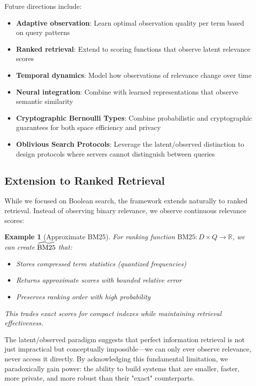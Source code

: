 \documentclass[11pt,final,hidelinks]{article}
\newtheorem{example}[theorem]{Example}
\begin{document}
Future directions include:
\begin{itemize}
    \item \textbf{Adaptive observation}: Learn optimal observation quality per term based on query patterns
    \item \textbf{Ranked retrieval}: Extend to scoring functions that observe latent relevance scores
    \item \textbf{Temporal dynamics}: Model how observations of relevance change over time
    \item \textbf{Neural integration}: Combine with learned representations that observe semantic similarity
    \item \textbf{Cryptographic Bernoulli Types}: Combine probabilistic and cryptographic guarantees for both space efficiency and privacy
    \item \textbf{Oblivious Search Protocols}: Leverage the latent/observed distinction to design protocols where servers cannot distinguish between queries
\end{itemize}

\subsection{Extension to Ranked Retrieval}

While we focused on Boolean search, the framework extends naturally to ranked retrieval. Instead of observing binary relevance, we observe continuous relevance scores:

\begin{example}[Approximate BM25]
For ranking function $\text{BM25}: D \times Q \to \mathbb{R}$, we can create $\widetilde{\text{BM25}}$ that:
\begin{itemize}
    \item Stores compressed term statistics (quantized frequencies)
    \item Returns approximate scores with bounded relative error
    \item Preserves ranking order with high probability
\end{itemize}
This trades exact scores for compact indexes while maintaining retrieval effectiveness.
\end{example}

The latent/observed paradigm suggests that perfect information retrieval is not just impractical but conceptually impossible—we can only ever observe relevance, never access it directly. By acknowledging this fundamental limitation, we paradoxically gain power: the ability to build systems that are smaller, faster, more private, and more robust than their "exact" counterparts.




\end{document}
